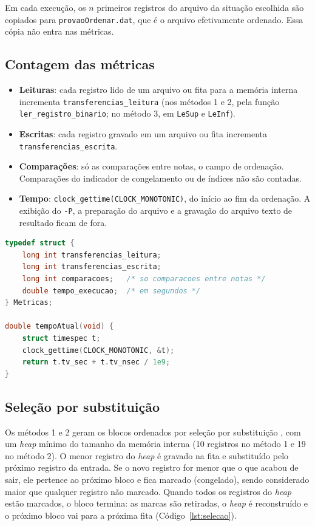 \documentclass{article}
\begin{document}
Em cada execução, os $n$ primeiros registros do arquivo da situação escolhida são copiados para \texttt{provaoOrdenar.dat}, que é o arquivo efetivamente ordenado. Essa cópia não entra nas métricas.

\subsection{Contagem das métricas}

\begin{itemize}
    \item \textbf{Leituras}: cada registro lido de um arquivo ou fita para a memória interna incrementa \texttt{transferencias\_leitura} (nos métodos 1 e 2, pela função \texttt{ler\_registro\_binario}; no método 3, em \texttt{LeSup} e \texttt{LeInf}).
    \item \textbf{Escritas}: cada registro gravado em um arquivo ou fita incrementa \texttt{transferencias\_escrita}.
    \item \textbf{Comparações}: só as comparações entre notas, o campo de ordenação. Comparações do indicador de congelamento ou de índices não são contadas.
    \item \textbf{Tempo}: \texttt{clock\_gettime(CLOCK\_MONOTONIC)}, do início ao fim da ordenação. A exibição do \texttt{-P}, a preparação do arquivo e a gravação do arquivo texto de resultado ficam de fora.
\end{itemize}

\begin{lstlisting}[caption={Estrutura de métricas (int2f.h) e relógio (int2f.c).},label={lst:metricas},language=C]
typedef struct {
    long int transferencias_leitura;
    long int transferencias_escrita;
    long int comparacoes;   /* so comparacoes entre notas */
    double tempo_execucao;  /* em segundos */
} Metricas;

double tempoAtual(void) {
    struct timespec t;
    clock_gettime(CLOCK_MONOTONIC, &t);
    return t.tv_sec + t.tv_nsec / 1e9;
}
\end{lstlisting}

\subsection{Seleção por substituição}

Os métodos 1 e 2 geram os blocos ordenados por seleção por substituição \cite{knuth1998}, com um \emph{heap} mínimo do tamanho da memória interna (10 registros no método 1 e 19 no método 2). O menor registro do \emph{heap} é gravado na fita e substituído pelo próximo registro da entrada. Se o novo registro for menor que o que acabou de sair, ele pertence ao próximo bloco e fica marcado (congelado), sendo considerado maior que qualquer registro não marcado. Quando todos os registros do \emph{heap} estão marcados, o bloco termina: as marcas são retiradas, o \emph{heap} é reconstruído e o próximo bloco vai para a próxima fita (Código~\ref{lst:selecao}).
\end{document}
